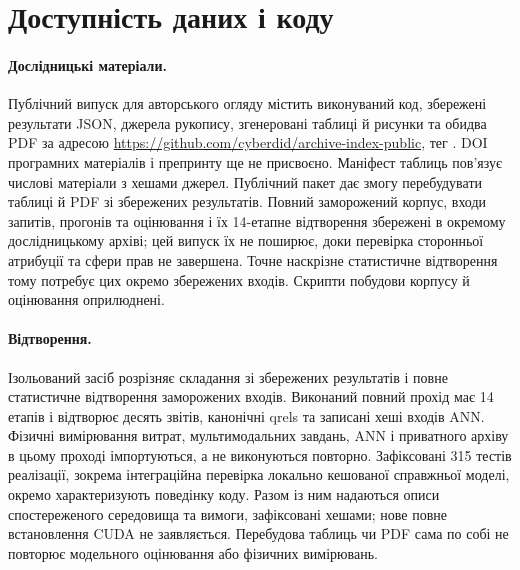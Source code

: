 \section{Доступність даних і коду}\label{sec:availability}

\paragraph{Дослідницькі матеріали.}
Публічний випуск для авторського огляду містить виконуваний код, збережені результати JSON, джерела рукопису, згенеровані таблиці й рисунки та обидва PDF за адресою \url{https://github.com/cyberdid/archive-index-public}, тег . DOI програмних матеріалів і препринту ще не присвоєно. Маніфест таблиць пов’язує числові матеріали з хешами джерел. Публічний пакет дає змогу перебудувати таблиці й PDF зі збережених результатів. Повний заморожений корпус, входи запитів, прогонів та оцінювання і їх 14-етапне відтворення збережені в окремому дослідницькому архіві; цей випуск їх не поширює, доки перевірка сторонньої атрибуції та сфери прав не завершена. Точне наскрізне статистичне відтворення тому потребує цих окремо збережених входів. Скрипти побудови корпусу й оцінювання оприлюднені.

\paragraph{Відтворення.}
Ізольований засіб  розрізняє складання зі збережених результатів і повне статистичне відтворення заморожених входів. Виконаний повний прохід має 14 етапів і відтворює десять звітів, канонічні qrels та записані хеші входів ANN. Фізичні вимірювання витрат, мультимодальних завдань, ANN і приватного архіву в цьому проході імпортуються, а не виконуються повторно. Зафіксовані 315 тестів реалізації, зокрема інтеграційна перевірка локально кешованої справжньої моделі, окремо характеризують поведінку коду. Разом із ним надаються описи спостереженого середовища та вимоги, зафіксовані хешами; нове повне встановлення CUDA не заявляється. Перебудова таблиць чи PDF сама по собі не повторює модельного оцінювання або фізичних вимірювань.

